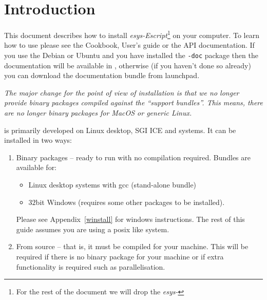 %
%
%

\chapter{Introduction}
This document describes how to install \emph{esys-Escript}\footnote{For the rest of the document we will drop the \emph{esys-}} on your computer.
To learn how to use \esfinley please see the Cookbook, User's guide or the API documentation.
If you use the Debian or Ubuntu and you have installed the \texttt{-doc} package then the documentation 
will be available in
, otherwise (if you haven't done so already) you can download the documentation bundle 
from launchpad.

\emph{The major change for the point of view of installation is that we no longer provide binary packages compiled
against the ``support bundles''.
This means, there are no longer binary packages for MacOS or generic Linux.
}

\esfinley is primarily developed on Linux desktop, SGI ICE and \macosx systems.
It can be installed in two ways:
\begin{enumerate}
  \item Binary packages -- ready to run with no compilation required.
      Bundles are available for:
      \begin{itemize}
	  \item Linux desktop systems with gcc (stand-alone bundle)
	  \item $32$bit Windows (requires some other packages to be installed).
      \end{itemize}
    Please see Appendix~\ref{winstall} for windows instructions.
    The rest of this guide assumes you are using a posix like system.
  \item From source -- that is, it must be compiled for your machine.
  This will be required if there is no binary package 
    for your machine or if extra functionality is required such as \mpi parallelisation.
\end{enumerate}

